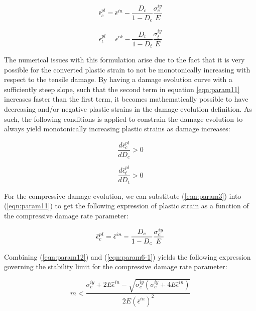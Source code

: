 \begin{equation}
\label{eqn:param11}
\bar{\epsilon}_{c}^{pl}=\bar{\epsilon}^{in}-\frac{D_{c}}{1-D_{c}}\frac{\sigma_{c}^{iy}}{E}
\end{equation}

\begin{equation}
\label{eqn:param11-1}
\bar{\epsilon}_{t}^{pl}=\bar{\epsilon}^{ck}-\frac{D_{t}}{1-D_{t}}\frac{\sigma_{t}^{iy}}{E}
\end{equation}


The numerical issues with this formulation arise due to the fact that it is very possible for the converted plastic strain to not be monotonically increasing with respect to the tensile damage. By having a damage evolution curve with a sufficiently steep slope, such that the second term in equation \ref{eqn:param11} increases faster than the first term, it becomes mathematically possible to have decreasing and/or negative plastic strains in the damage evolution definition. As such, the following conditions is applied to constrain the damage evolution to always yield monotonically increasing plastic strains as damage increases:

\begin{equation}
\label{eqn:param6-1}
\frac{d\bar{\epsilon}_{c}^{pl}}{dD_{c}}>0
\end{equation}

\begin{equation}
\label{eqn:param6-2}
\frac{d\bar{\epsilon}_{t}^{pl}}{dD_{t}}>0
\end{equation}


For the compressive damage evolution, we can substitute (\ref{eqn:param3}) into (\ref{eqn:param11}) to get the following expression of plastic strain as a function of the compressive damage rate parameter:

\begin{equation}
\bar{\epsilon}_{c}^{pl}=\bar{\epsilon}^{in}-\frac{D_{c}}{1-D_{c}}\frac{\sigma_{c}^{iy}}{E}\\
\label{eqn:param12}
\end{equation}

Combining (\ref{eqn:param12}) and (\ref{eqn:param6-1}) yields the following expression governing the stability limit for the compressive damage rate parameter:

\begin{equation}
m<\frac{\sigma_{c}^{iy}+2E\bar{\epsilon}^{in}-\sqrt{\sigma_{c}^{iy}\left(\sigma_{c}^{iy}+4E\bar{\epsilon}^{in}\right)}}{2E\left(\bar{\epsilon}^{in}\right)^{2}}\label{eqn:param13}
\end{equation}

